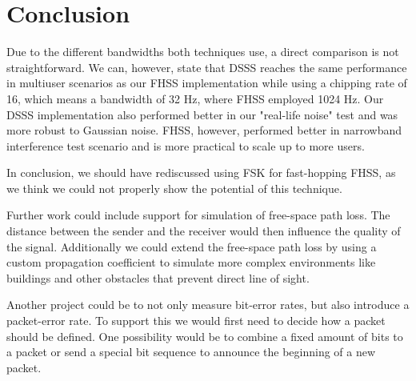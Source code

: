 \section{Conclusion}
    
    
    Due to the different bandwidths both techniques use, a direct comparison is not straightforward. We can, however, state that DSSS reaches the same performance in multiuser scenarios as our FHSS implementation while using a chipping rate of 16, which means a bandwidth of 32 Hz, where FHSS employed 1024 Hz. Our DSSS implementation also performed better in our "real-life noise" test and was more robust to Gaussian noise. FHSS, however, performed better in narrowband interference test scenario and is more practical to scale up to more users.
    
    In conclusion, we should have rediscussed using FSK for fast-hopping FHSS, as we think we could not properly show the potential of this technique.
    
    
    Further work could include support for simulation of free-space path loss. The distance between the sender and the receiver would then influence the quality of the signal. Additionally we could extend the free-space path loss by using a custom propagation coefficient to simulate more complex environments like buildings and other obstacles that prevent direct line of sight.
    
    
    Another project could be to not only measure bit-error rates, but also introduce a packet-error rate. To support this we would first need to decide how a packet should be defined. One possibility would be to combine a fixed amount of bits to a packet or send a special bit sequence to announce the beginning of a new packet.